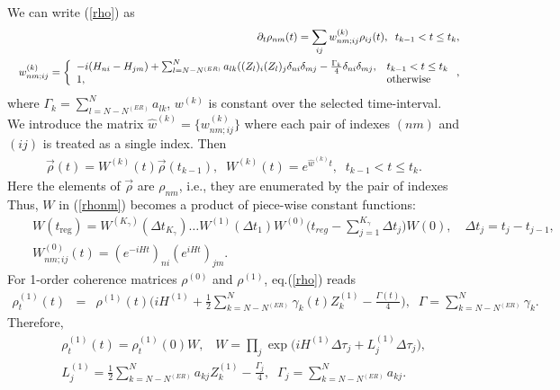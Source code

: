 \documentclass[pra,preprint,showpacs]{revtex4-1}
\begin{document}
We can write (\ref{rho}) as
\begin{eqnarray}
\label{rhonm2}
&&
\partial_t\rho_{nm}(t) = \sum_{ij} w^{(k)}_{nm;ij}\rho_{ij}(t), \;\; t_{k-1} < t \le t_k,\\\nonumber
&&
w^{(k)}_{nm;ij}=\left\{
\begin{array}{ll}
 -i (H_{ni} - H_{jm}) + \sum_{l=N-N^{(ER)}}^N a_{lk} ((Z_l)_i (Z_l)_j \delta_{ni}\delta_{mj} - \frac{\Gamma_k}{4} \delta_{ni}\delta_{mj},& t_{k-1}<t\le t_k\cr
1,& {\mbox{otherwise}}\end{array}\right.,
\end{eqnarray}
where $\Gamma_k = \sum_{l=N-N^{(ER)}}^N a_{lk}$,   $w^{(k)}$ is constant over the selected time-interval.
 We introduce the matrix $\hat w^{(k)} =\{w^{(k)}_{nm;ij}\}$  where each pair of indexes $(nm)$ and $(ij)$ is treated as a single index.
Then
 \begin{eqnarray}\label{rhoT}
 \vec{\rho}(t) = W^{(k)}(t) \vec{\rho}(t_{k-1}),\;\; W^{(k)}(t)=e^{\hat w^{(k)} t}, \;\; t_{k-1} < t \le t_k.
 \end{eqnarray}
Here the elements of $\vec{\rho}$ are $\rho_{nm}$, i.e., they are enumerated by the pair of indexes
Thus, $W$ in (\ref{rhonm})  becomes a product of piece-wise constant functions: %
\begin{eqnarray}\label{UtK}
&&
W(t_{\mathrm{reg}})=  W^{(K_\gamma)}(\Delta t_{K_\gamma})\dots W^{(1)}(\Delta t_1) W^{(0)}\Big(t_{reg} - \sum_{j=1}^{K_\gamma} \Delta t_j\Big) W(0),\quad  \Delta t_j = t_j -t_{j-1},\\\label{W0}
&&W^{(0)}_{nm;ij}(t) =\left( e^{-iHt} \right)_{ni}
\left( e^{iH t} \right)_{jm}.
\end{eqnarray}
\iffalse
For 1-order coherence matrices $\rho^{(0)}$ and $\rho^{(1)}$, eq.(\ref{rho}) reads
\begin{eqnarray}\label{rho01coh}
 \rho^{(1)}_t(t)&=&\rho^{(1)}(t) \Big(i H^{(1)}+  \frac{1}{2}   \sum_{k=N-N^{(ER)}}^N\gamma_k (t)Z^{(1)}_{k}
-\frac{\Gamma(t)}{4}\Big) ,\;\;\Gamma=\sum_{k=N-N^{(ER)}}^N \gamma_k.
\end{eqnarray}
Therefore,
\begin{eqnarray}
&&\rho^{(1)}_t(t) =  \rho^{(1)}_t(0)  W,\;\;\; W=\prod_{j} \exp\Big( i H^{(1)}\Delta \tau_j + L^{(1)}_j \Delta \tau_j  \Big), \\\nonumber
&&L^{(1)}_j=  \frac{1}{2}   \sum_{k=N-N^{(ER)}}^N a_{kj}Z^{(1)}_{k}
-\frac{\Gamma_j}{4},\;\;\Gamma_j=\sum_{k=N-N^{(ER)}}^N a_{kj}.
\end{eqnarray}
\end{document}
